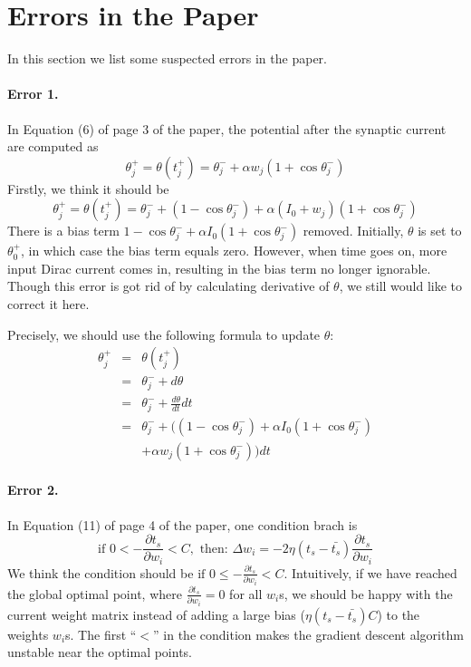 \section{Errors in the Paper}
\label{error}

In this section we list some suspected errors in the paper.

\paragraph{Error 1.}
In Equation (6) of page 3 of the paper, the potential after the synaptic current are computed as
\begin{equation}
	\theta_j^+ = \theta(t_j^+) = \theta_j^- + \alpha w_j (1+\cos \theta_j^-)
\end{equation}
Firstly, we think it should be 
\begin{equation}
	\theta_j^+ = \theta(t_j^+) = \theta_j^- + (1-\cos \theta_j^-) + \alpha (I_0 + w_j) (1+\cos \theta_j^-)
\end{equation}
There is a bias term $ 1-\cos \theta_j^- +  \alpha I_0 (1+\cos \theta_j^-)$ removed. Initially, $\theta$ is set to $\theta_0^+$, in which case the bias term equals zero. However, when time goes on, more input Dirac current comes in, resulting in the bias term no longer ignorable. Though this error is got rid of by calculating derivative of $\theta$,  we still would like to correct it here.

Precisely, we should use the following formula to update $\theta$:
\begin{eqnarray}
	\theta_j^+ &=& \theta(t_j^+) \\
	&=& \theta_j^- + d\theta \\
	&=& \theta_j^- + \frac{d\theta}{dt} dt\\
	&=& \theta_j^- + ((1-\cos \theta_j^-) +  \alpha I_0 (1+\cos \theta_j^-)\\
	 &&+ \alpha w_j (1+\cos \theta_j^-))dt
\end{eqnarray}


\paragraph{Error 2.} 
In Equation (11) of page 4 of the paper, one condition brach is
\begin{equation}
	\textrm{if } 0 < -\frac{\partial t_s}{\partial w_i} < C,
	\textrm{ then: } \Delta w_i = -2\eta(t_s - \bar{t_s}) \frac{\partial t_s}{\partial w_i}
\end{equation}
We think the condition should be $\textrm{if } 0 \leq -\frac{\partial t_s}{\partial w_i} < C$.
Intuitively, if we have reached the global optimal point, where $\frac{\partial t_s}{\partial w_i} = 0$ for all $w_i$s,
we should be happy with the current weight matrix
instead of adding a large bias ($\eta(t_s - \bar{t_s}) C$) to the weights $w_i$s.
The first ``$<$'' in the condition makes the gradient descent algorithm unstable near the optimal points.


